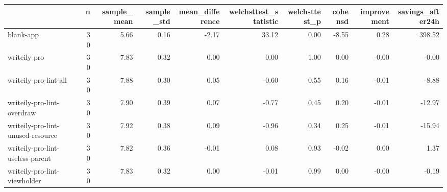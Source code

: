 \begin{tabular}{lrrrrrrrrr}
\toprule
{} &   n &  sample\_mean &  sample\_std &  mean\_difference &  welchsttest\_statistic &  welchsttest\_p &  cohensd &  improvement &  savings\_after24h \\
\midrule
blank-app                         &  30 &         5.66 &        0.16 &            -2.17 &                  33.12 &           0.00 &    -8.55 &         0.28 &            398.52 \\
writeily-pro                      &  30 &         7.83 &        0.32 &             0.00 &                   0.00 &           1.00 &     0.00 &        -0.00 &             -0.00 \\
writeily-pro-lint-all             &  30 &         7.88 &        0.30 &             0.05 &                  -0.60 &           0.55 &     0.16 &        -0.01 &             -8.88 \\
writeily-pro-lint-overdraw        &  30 &         7.90 &        0.39 &             0.07 &                  -0.77 &           0.45 &     0.20 &        -0.01 &            -12.97 \\
writeily-pro-lint-unused-resource &  30 &         7.92 &        0.38 &             0.09 &                  -0.96 &           0.34 &     0.25 &        -0.01 &            -15.94 \\
writeily-pro-lint-useless-parent  &  30 &         7.82 &        0.36 &            -0.01 &                   0.08 &           0.93 &    -0.02 &         0.00 &              1.37 \\
writeily-pro-lint-viewholder      &  30 &         7.83 &        0.32 &             0.00 &                  -0.01 &           0.99 &     0.00 &        -0.00 &             -0.19 \\
\bottomrule
\end{tabular}
